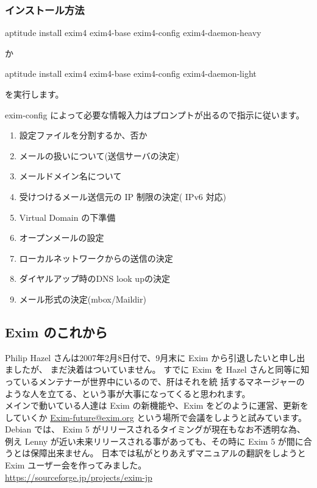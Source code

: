 \documentclass[mingoth,a4paper]{jsarticle}
\begin{document}
\subsubsection{インストール方法}

\begin{commandline}
aptitude install exim4 exim4-base exim4-config exim4-daemon-heavy
\end{commandline}
か
\begin{commandline}
aptitude install exim4 exim4-base exim4-config exim4-daemon-light
\end{commandline}
を実行します。

exim-config によって必要な情報入力はプロンプトが出るので指示に従います。 \\
\begin{enumerate}
\item 設定ファイルを分割するか、否か
\item メールの扱いについて(送信サーバの決定)
\item メールドメイン名について
\item 受けつけるメール送信元の IP 制限の決定( IPv6 対応)
\item Virtual Domain の下準備
\item オープンメールの設定
\item ローカルネットワークからの送信の決定
\item ダイヤルアップ時のDNS look upの決定
\item メール形式の決定(mbox/Maildir)
\end{enumerate}

\subsection{Exim のこれから}
 Philip Hazel さんは2007年2月8日付で、9月末に Exim から引退したいと申し出ましたが、
まだ決着はついていません。
すでに Exim を Hazel さんと同等に知っているメンテナーが世界中にいるので、肝はそれを統
括するマネージャーのような人を立てる、という事が大事になってくると思われます。\\
メインで動いている人達は Exim の新機能や、Exim をどのように運営、更新をしていくか 
\url{Exim-future@exim.org} という場所で会議をしようと試みています。\\
Debian では、 Exim 5 がリリースされるタイミングが現在もなお不透明な為、例え Lenny 
が近い未来リリースされる事があっても、その時に Exim 5 が間に合うとは保障出来ません。
日本では私がとりあえずマニュアルの翻訳をしようとExim ユーザー会を作ってみました。\\
\url{https://sourceforge.jp/projects/exim-jp}
\end{document}
